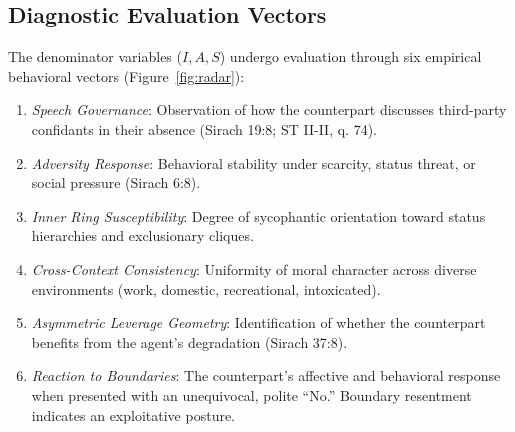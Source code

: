 \documentclass[11pt,twocolumn]{article}
\begin{document}
\subsection{Diagnostic Evaluation Vectors}
The denominator variables ($I, A, S$) undergo evaluation through six empirical behavioral vectors (Figure~\ref{fig:radar}):
\begin{enumerate}
    \item \textit{Speech Governance}: Observation of how the counterpart discusses third-party confidants in their absence (Sirach 19:8; ST II-II, q. 74).
    \item \textit{Adversity Response}: Behavioral stability under scarcity, status threat, or social pressure (Sirach 6:8).
    \item \textit{Inner Ring Susceptibility}: Degree of sycophantic orientation toward status hierarchies and exclusionary cliques.
    \item \textit{Cross-Context Consistency}: Uniformity of moral character across diverse environments (work, domestic, recreational, intoxicated).
    \item \textit{Asymmetric Leverage Geometry}: Identification of whether the counterpart benefits from the agent's degradation (Sirach 37:8).
    \item \textit{Reaction to Boundaries}: The counterpart's affective and behavioral response when presented with an unequivocal, polite ``No.'' Boundary resentment indicates an exploitative posture.
\end{enumerate}
\end{document}
